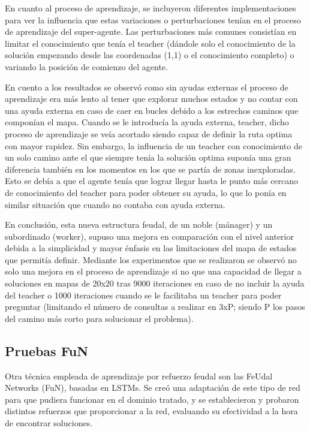 \documentclass[letterpaper]{article} %
\begin{document}
En cuanto al proceso de aprendizaje, se incluyeron diferentes implementaciones para ver la influencia que estas variaciones o perturbaciones tenían en el proceso de aprendizaje del super-agente. Las perturbaciones más comunes consistían en limitar el conocimiento que tenía el teacher (dándole solo el conocimiento de la solución empezando desde las coordenadas (1,1) o el conocimiento completo) o variando la posición de comienzo del agente.

En cuento a los resultados se observó como sin ayudas externas el proceso de aprendizaje era más lento al tener que explorar muchos estados y no contar con una ayuda externa en caso de caer en bucles debido a los estrechos caminos que componían el mapa. Cuando se le introducía la ayuda externa, teacher, dicho proceso de aprendizaje se veía acortado siendo capaz de definir la ruta optima con mayor rapidez. Sin embargo, la influencia de un teacher con conocimiento de un solo camino ante el que siempre tenía la solución optima suponía una gran diferencia también en los momentos en los que se partía de zonas inexploradas. Esto se debía a que el agente tenía que lograr llegar hasta le punto más cercano de conocimiento del teacher para poder obtener su ayuda, lo que lo ponía en similar situación que cuando no contaba con ayuda externa.

En conclusión, esta nueva estructura feudal, de un noble (mánager) y un subordinado (worker), supuso una mejora en comparación con el nivel anterior debida a la simplicidad y mayor énfasis en las limitaciones del mapa de estados que permitía definir. Mediante los experimentos que se realizaron se observó no solo una mejora en el proceso de aprendizaje si no que una capacidad de llegar a soluciones en mapas de 20x20 tras 9000 iteraciones en caso de no incluir la ayuda del teacher o 1000 iteraciones cuando se le facilitaba un teacher para poder preguntar (limitando el número de consultas a realizar en 3xP; siendo P los pasos del camino más corto para solucionar el problema). 


\subsection{Pruebas FuN}
Otra técnica empleada de aprendizaje por refuerzo feudal son las FeUdal Networks (FuN), basadas en LSTMs. Se creó una adaptación de este tipo de red para que pudiera funcionar en el dominio tratado, y se establecieron y probaron distintos refuerzos que proporcionar a la red, evaluando su efectividad a la hora de encontrar soluciones.
\end{document}
